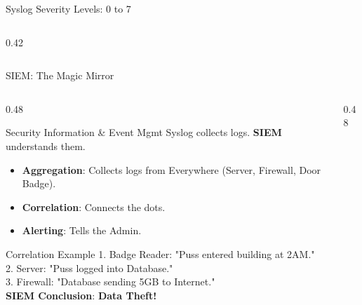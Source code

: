 \documentclass[aspectratio=169]{beamer}  %
\begin{document}
\begin{frame}{Syslog Severity Levels: 0 to 7}
\begin{columns}[T]
\begin{column}{0.42\textwidth}
\begin{center}
            \end{center}
        \end{column}
    \end{columns}
\end{frame}

\begin{frame}{SIEM: The Magic Mirror}
    \begin{columns}[T]
        \begin{column}{0.48\textwidth}
            \begin{block}{Security Information \& Event Mgmt}
                \footnotesize
                Syslog collects logs. \textbf{SIEM} understands them.
                \begin{itemize}
                    \item \textbf{Aggregation}: Collects logs from Everywhere (Server, Firewall, Door Badge).
                    \item \textbf{Correlation}: Connects the dots.
                    \item \textbf{Alerting}: Tells the Admin.
                \end{itemize}
            \end{block}
            \begin{alertblock}{Correlation Example}
                \footnotesize
                1. Badge Reader: "Puss entered building at 2AM."\\
                2. Server: "Puss logged into Database."\\
                3. Firewall: "Database sending 5GB to Internet."\\
                \textbf{SIEM Conclusion}: \textbf{Data Theft!}
            \end{alertblock}
        \end{column}
        \begin{column}{0.48\textwidth}
            \begin{center}
\end{center}
\end{column}
\end{columns}
\end{frame}
\end{document}
